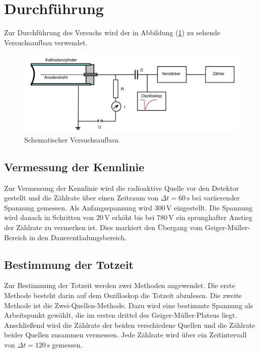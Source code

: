 \section{Durchführung}
\label{sec:Durchführung}
Zur Durchführung des Versuchs wird der in Abbildung (\ref{fig:Versuchsaufbau}) zu sehende Versuchsaufbau
verwendet. 
\begin{figure}[H]
    \centering
    \includegraphics[width=\textwidth]{content/Bilder/Gesamte_Schaltung.jpeg}
    \caption{Schematischer Versuchsaufbau.}
    \label{fig:Versuchsaufbau}
\end{figure}
\subsection{Vermessung der Kennlinie}
Zur Vermessung der Kennlinie wird die radioaktive Quelle 
vor den Detektor gestellt und die Zählrate über einen 
Zeitraum von $\Delta t = 60 \, \unit{\second}$ bei variierender
Spannung gemessen. Als Anfangsspannung wird $300 \, \unit{\volt}$
eingestellt. Die Spannung wird danach in Schritten von $20 \, \unit{\volt}$
erhöht bis bei $780 \, \unit{\volt}$ ein sprunghafter Anstieg der
Zählrate zu vermerken ist. Dies markiert den Übergang vom Geiger-Müller-Bereich 
in den Dauerentladungsbereich. 
\subsection{Bestimmung der Totzeit}
Zur Bestimmung der Totzeit werden zwei Methoden angewendet. Die erste Methode besteht 
darin auf dem Oszilloskop die Totzeit abzulesen. 
Die zweite Methode ist die Zwei-Quellen-Methode. Dazu wird eine bestimmte Spannung als
Arbeitspunkt gewählt, die im ersten drittel des Geiger-Müller-Plateus liegt. Anschließend
wird die Zählrate der beiden verschiedene Quellen und die Zählrate beider Quellen 
zusammen vermessen. Jede Zählrate wird über ein Zeitintervall von 
$\Delta t = 120 \, \unit{\second}$ gemessen. 